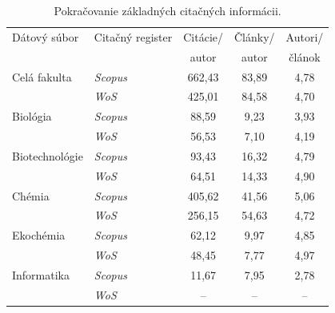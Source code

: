 \begin{table}
\centering\small
\begin{tabular}{llccc}
  \hline\noalign{\vspace{.3ex}}
  Dátový súbor & Citačný register  & Citácie/ & Články/ & Autori/ \\
               &                   & autor    & autor   & článok  \\[0.3ex]
  \hline\noalign{\vspace{.5ex}}
  Celá fakulta   & \emph{Scopus} & 662,43 & 83,89 & 4,78 \\
                 & \emph{WoS}    & 425,01 & 84,58 & 4,70 \\[1ex]
  Biológia       & \emph{Scopus} &  88,59 &  9,23 & 3,93 \\
                 & \emph{WoS}    &  56,53 &  7,10 & 4,19 \\[1ex]
  Biotechnológie & \emph{Scopus} &  93,43 & 16,32 & 4,79 \\
                 & \emph{WoS}    &  64,51 & 14,33 & 4,90 \\[1ex]
  Chémia         & \emph{Scopus} & 405,62 & 41,56 & 5,06 \\
                 & \emph{WoS}    & 256,15 & 54,63 & 4,72 \\[1ex]
  Ekochémia      & \emph{Scopus} &  62,12 &  9,97 & 4,85 \\
                 & \emph{WoS}    &  48,45 &  7,77 & 4,97 \\[1ex]
  Informatika    & \emph{Scopus} &  11,67 &  7,95 & 2,78 \\
                 & \emph{WoS}    &  --    & --    & --   \\[0.5ex]
  \hline
\end{tabular}
\caption{Pokračovanie základných citačných informácii.}
\label{tab:citation.info2}
\end{table}

